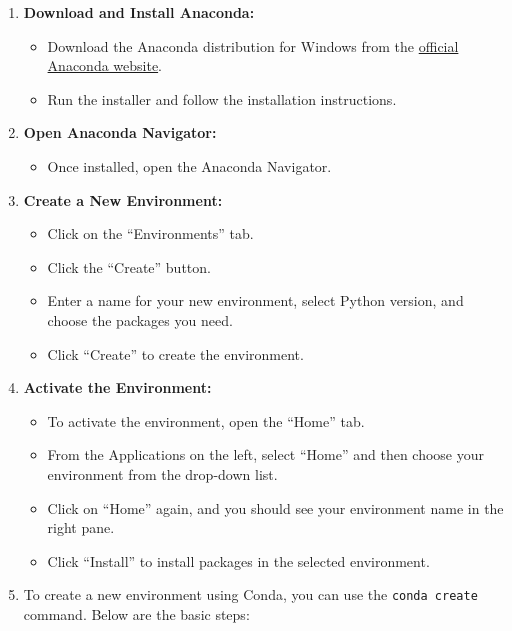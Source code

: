 \documentclass[
  letterpaper,
  DIV=11,
  numbers=noendperiod]{scrreprt}
\providecommand{\tightlist}{%
  \setlength{\itemsep}{0pt}\setlength{\parskip}{0pt}}\usepackage{longtable,booktabs,array}
\begin{document}
\begin{enumerate}
\def\labelenumi{\arabic{enumi}.}
\item
  \textbf{Download and Install Anaconda:}

  \begin{itemize}
  \tightlist
  \item
    Download the Anaconda distribution for Windows from the
    \href{https://www.anaconda.com/products/distribution}{official
    Anaconda website}.
  \item
    Run the installer and follow the installation instructions.
  \end{itemize}
\item
  \textbf{Open Anaconda Navigator:}

  \begin{itemize}
  \tightlist
  \item
    Once installed, open the Anaconda Navigator.
  \end{itemize}
\item
  \textbf{Create a New Environment:}

  \begin{itemize}
  \tightlist
  \item
    Click on the ``Environments'' tab.
  \item
    Click the ``Create'' button.
  \item
    Enter a name for your new environment, select Python version, and
    choose the packages you need.
  \item
    Click ``Create'' to create the environment.
  \end{itemize}
\item
  \textbf{Activate the Environment:}

  \begin{itemize}
  \tightlist
  \item
    To activate the environment, open the ``Home'' tab.
  \item
    From the Applications on the left, select ``Home'' and then choose
    your environment from the drop-down list.
  \item
    Click on ``Home'' again, and you should see your environment name in
    the right pane.
  \item
    Click ``Install'' to install packages in the selected environment.
  \end{itemize}
\item
  To create a new environment using Conda, you can use the
  \texttt{conda\ create} command. Below are the basic steps:


\end{enumerate}
\end{document}
